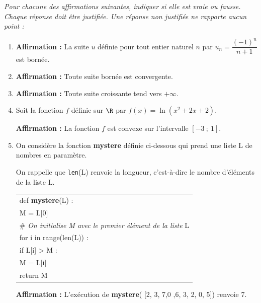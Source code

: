 \medskip

\emph{Pour  chacune des affirmations suivantes, indiquer si elle est vraie ou fausse. Chaque
réponse doit être justifiée. Une réponse non justifiée ne rapporte aucun point :}

\medskip

\begin{enumerate}
\item \textbf{Affirmation :} La suite $u$ définie pour tout entier naturel $n$ par $u_n = \dfrac{(- 1)^n}{n + 1}$ est bornée.
\item \textbf{Affirmation :} Toute suite bornée est convergente.
\item \textbf{Affirmation :} Toute suite croissante tend vers $+\infty$.
\item Soit la fonction $f$ définie sur $\R$ par $f(x) = \ln \left(x^2 + 2x + 2\right)$.

\textbf{Affirmation :} La fonction $f$ est convexe sur l'intervalle $[-3~;~1]$.
\item On considère la fonction {\ttfamily \textbf{mystere}} définie ci-dessous qui prend une liste L de nombres en paramètre. 

On rappelle que \texttt{len}(L) renvoie la longueur, c'est-à-dire
le nombre d'éléments de la liste L.

\begin{center}
\begin{tabular}{|>{\ttfamily}l|}\hline
 def \textbf{mystere}(L) :\\
\qquad M = L[0]\\
\qquad \# \emph{On initialise M avec le premier élément de la liste }L\\
\qquad for i in range(len(L)) : \\
\qquad \quad if L[i] > M :\\
\qquad \qquad M = L[i]\\
\qquad return M \\ \hline
\end{tabular}
\end{center}

\textbf{Affirmation :} L'exécution de {\ttfamily \textbf{mystere}( [2, 3, 7,0 ,6, 3, 2, 0, 5])} renvoie 7.
\end{enumerate}
